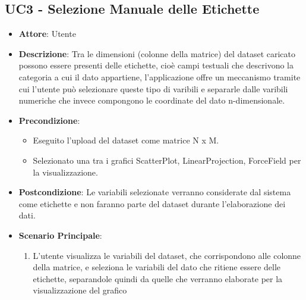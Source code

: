 \subsection{UC3 - Selezione Manuale delle Etichette}
    
    \begin{itemize}
    \item \textbf{Attore}: Utente
    \item \textbf{Descrizione}: Tra le dimensioni (colonne della matrice) del dataset caricato possono essere presenti delle etichette, cioè campi testuali che descrivono la categoria a cui il dato appartiene, l'applicazione offre un meccanismo tramite cui l'utente può selezionare queste tipo di varibili e separarle dalle varibili numeriche che invece compongono le coordinate del dato n-dimensionale.
    \item \textbf{Precondizione}:
    \begin{itemize}
        \item Eseguito l'upload del dataset come matrice N x M.
        \item Selezionato una tra i grafici ScatterPlot, LinearProjection, ForceField per la visualizzazione.
    \end{itemize}
    \item \textbf{Postcondizione}: Le variabili selezionate verranno considerate dal sistema come etichette e non faranno parte del dataset durante l'elaborazione dei dati.
    \item \textbf{Scenario Principale}: 
    \begin{enumerate}
        \item L'utente visualizza le variabili del dataset, che corrispondono alle colonne della matrice, e seleziona le variabili del dato che ritiene essere delle etichette, separandole quindi da quelle che verranno elaborate per la visualizzazione del grafico
    \end{enumerate}  
    \end{itemize}
    
